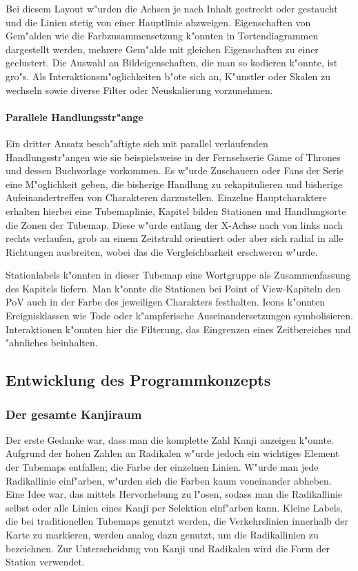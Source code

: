 Bei diesem Layout w"urden die Achsen je nach Inhalt gestreckt oder gestaucht und die Linien stetig von einer Hauptlinie abzweigen. Eigenschaften von Gem"alden wie die Farbzusammensetzung k"onnten in Tortendiagrammen dargestellt werden, mehrere Gem"alde mit gleichen Eigenschaften zu einer geclustert. Die Auswahl an Bildeigenschaften, die man so kodieren k"onnte, ist gro"s. Als Interaktionsm"oglichkeiten b"ote sich an, K"unstler oder Skalen zu wechseln sowie diverse Filter oder Neuskalierung vorzunehmen. 

\paragraph{Parallele Handlungsstr"ange}
Ein dritter Ansatz besch"aftigte sich mit parallel verlaufenden Handlungsstr"angen wie sie beispielsweise in der Fernsehserie Game of Thrones und dessen Buchvorlage vorkommen. Es w"urde Zuschauern oder Fans der Serie eine M"oglichkeit geben, die bisherige Handlung zu rekapitulieren und bisherige Aufeinandertreffen von Charakteren darzustellen. Einzelne Hauptcharaktere erhalten hierbei eine Tubemaplinie, Kapitel bilden Stationen und Handlungsorte die Zonen der Tubemap. Diese w"urde entlang der X-Achse nach von links nach rechts verlaufen, grob an einem Zeitstrahl orientiert oder aber sich radial in alle Richtungen ausbreiten, wobei das die Vergleichbarkeit erschweren w"urde.

Stationlabels k"onnten in dieser Tubemap eine Wortgruppe als Zusammenfassung des Kapitels liefern. Man k"onnte die Stationen bei Point of View-Kapiteln den PoV auch in der Farbe des jeweiligen Charakters festhalten. Icons k"onnten Ereignisklassen wie Tode oder k"ampferische Auseinandersetzungen symbolisieren. Interaktionen k"onnten hier die Filterung, das Eingrenzen eines Zeitbereiches und "ahnliches beinhalten. 


\subsection{Entwicklung des Programmkonzepts}
\subsubsection{Der gesamte Kanjiraum}
Der erste Gedanke war, dass man die komplette Zahl Kanji anzeigen k"onnte. Aufgrund der hohen Zahlen an Radikalen w"urde jedoch ein wichtiges Element der Tubemaps entfallen; die Farbe der einzelnen Linien. W"urde man jede Radikallinie einf"arben, w"urden sich die Farben kaum voneinander abheben. Eine Idee war, das mittels Hervorhebung zu l"osen, sodass man die Radikallinie selbst oder alle Linien eines Kanji per Selektion einf"arben kann. Kleine Labels, die bei traditionellen Tubemaps genutzt werden, die Verkehrslinien innerhalb der Karte zu markieren, werden analog dazu genutzt, um die Radikallinien zu bezeichnen. Zur Unterscheidung von Kanji und Radikalen wird die Form der Station verwendet.

